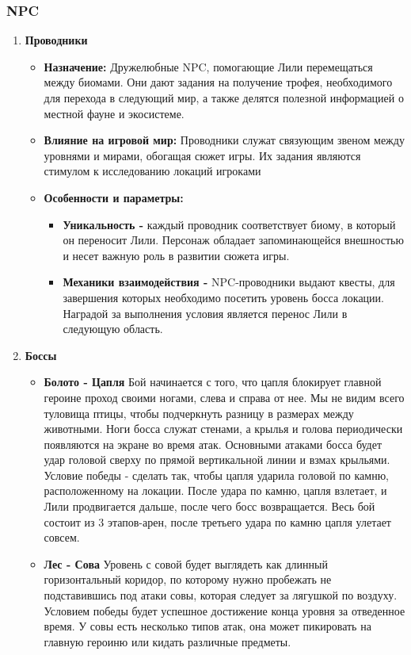 \documentclass{article}
\begin{document}
\subsubsection{NPC}
\begin{enumerate}

\item \textbf{Проводники}
    \begin{itemize}
     \item \textbf{Назначение:} Дружелюбные NPC, помогающие Лили перемещаться между биомами. Они дают задания на получение трофея, необходимого для перехода в следующий мир, а также делятся полезной информацией о местной фауне и экосистеме. 
     \item \textbf{Влияние на игровой мир:} Проводники служат связующим звеном между уровнями и мирами, обогащая сюжет игры. Их задания являются стимулом к исследованию локаций игроками
     \item \textbf{Особенности и параметры:}
     \begin{itemize}
            \item \textbf{Уникальность -} каждый проводник соответствует биому, в который он переносит Лили. Персонаж обладает запоминающейся внешностью и несет важную роль в развитии сюжета игры.
            \item \textbf{Механики взаимодействия -} NPC-проводники выдают квесты, для завершения которых необходимо посетить уровень босса локации. Наградой за выполнения условия является перенос Лили в следующую область.
     \end {itemize}
     \end{itemize}
\item \textbf{Боссы}
    \begin{itemize}
     \item \textbf{Болото - Цапля} Бой начинается с того, что цапля  блокирует главной героине проход своими ногами, слева и справа от нее. Мы не видим всего туловища птицы, чтобы подчеркнуть разницу в размерах между животными. Ноги босса служат стенами, а крылья и голова периодически появляются на экране во время атак. Основными атаками босса будет удар головой сверху по прямой вертикальной линии и взмах крыльями. Условие победы - сделать так, чтобы цапля ударила головой по камню, расположенному на локации. После удара по камню, цапля взлетает, и Лили продвигается дальше, после чего босс возвращается. Весь бой состоит из 3 этапов-арен, после третьего удара по камню цапля улетает совсем.
     \item \textbf{Лес - Сова} Уровень с совой будет выглядеть как длинный горизонтальный коридор, по которому нужно пробежать не подставившись под атаки совы, которая следует за лягушкой по воздуху. Условием победы будет успешное достижение конца уровня за отведенное время. У совы есть несколько типов атак, она может пикировать на главную героиню или кидать различные предметы. 

\end{itemize}
\end{enumerate}
\end{document}
